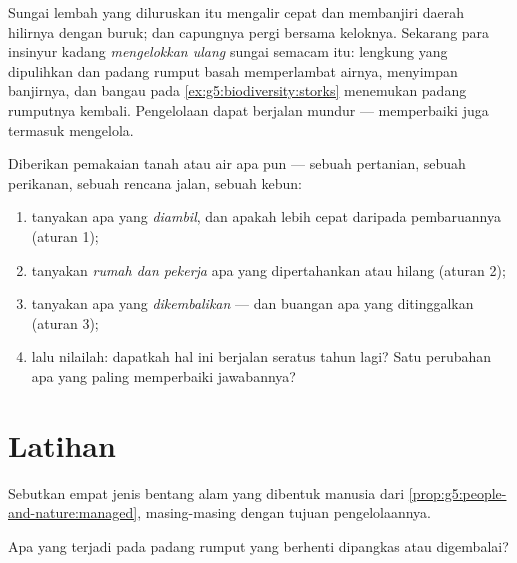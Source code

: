 \begin{example}\label{ex:g5:people-and-nature:river}
Sungai lembah yang diluruskan itu mengalir cepat dan membanjiri
daerah hilirnya dengan buruk;  dan capungnya pergi bersama
keloknya. Sekarang para insinyur kadang \emph{mengelokkan ulang}
sungai semacam itu: lengkung yang dipulihkan dan padang rumput basah
memperlambat airnya, menyimpan banjirnya, dan bangau pada
\cref{ex:g5:biodiversity:storks} menemukan padang rumputnya kembali.
Pengelolaan dapat berjalan mundur --- memperbaiki juga termasuk
mengelola.
\end{example}

\begin{method}\label{met:g5:people-and-nature:judge}
Diberikan pemakaian tanah atau air apa pun --- sebuah pertanian, sebuah
perikanan, sebuah rencana jalan, sebuah kebun:
\begin{enumerate}
  \item tanyakan apa yang \emph{diambil}, dan apakah lebih cepat
        daripada pembaruannya (aturan 1);
  \item tanyakan \emph{rumah dan pekerja} apa yang dipertahankan atau
        hilang (aturan 2);
  \item tanyakan apa yang \emph{dikembalikan} --- dan buangan apa yang
        ditinggalkan (aturan 3);
  \item lalu nilailah: dapatkah hal ini berjalan seratus tahun lagi?
        Satu perubahan apa yang paling memperbaiki jawabannya?
\end{enumerate}
\end{method}

\section{Latihan}

\begin{exercise}[$\star$]\label{exo:g5:people-and-nature:1}
Sebutkan empat jenis bentang alam yang dibentuk manusia dari
\cref{prop:g5:people-and-nature:managed}, masing-masing dengan tujuan
pengelolaannya.
\end{exercise}

\begin{exercise}[$\star$]\label{exo:g5:people-and-nature:2}
Apa yang terjadi pada padang rumput yang berhenti dipangkas atau
digembalai?
\end{exercise}

